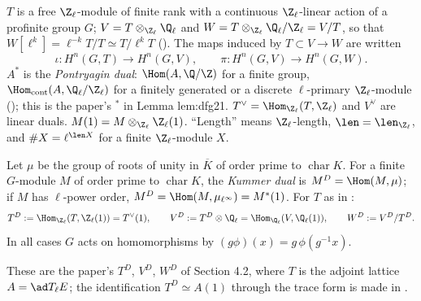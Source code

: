 \begin{convention}\label{conv:galcoh:duals}
$T$ is a free $\Z_\ell$-module of finite rank with a continuous $\Z_\ell$-linear action of a profinite group $G$; $V=T\otimes_{\Z_\ell}\Q_\ell$ and
$W=T\otimes_{\Z_\ell}\Q_\ell/\Z_\ell=V/T$, so that $W[\ell^k]=\ell^{-k}T/T\simeq T/\ell^kT$ (). The maps induced by $T\subset V\to W$ are written
\[
\iota\colon H^n(G,T)\to H^n(G,V),\qquad\pi\colon H^n(G,V)\to H^n(G,W).
\]
$A^*$ is the \emph{Pontryagin dual}: $\Hom(A,\Q/\Z)$ for a finite group, $\Hom_{\mathrm{cont}}(A,\Q_\ell/\Z_\ell)$ for a finitely generated or a discrete $\ell$-primary
$\Z_\ell$-module (); this is the paper's ${}^*$ in Lemma lem:dfg21. $T^\vee=\Hom_{\Z_\ell}(T,\Z_\ell)$ and $V^\vee$ are linear duals. $M(1)=M\otimes_{\Z_\ell}\Z_\ell(1)$.
``Length'' means $\Z_\ell$-length, $\len=\len_{\Z_\ell}$, and $\#X=\ell^{\len X}$ for a finite $\Z_\ell$-module $X$.
\end{convention}

\begin{definition}\label{def:galcoh:kummer-duals}
Let $\mu$ be the group of roots of unity in $\overline K$ of order prime to $\operatorname{char}K$. For a finite
$G$-module $M$ of order prime to $\operatorname{char}K$, the \emph{Kummer dual} is $M^D=\Hom(M,\mu)$; if $M$ has $\ell$-power order, $M^D=\Hom(M,\mu_{\ell^\infty})=M^*(1)$. For
$T$ as in :
\[
T^D:=\Hom_{\Z_\ell}(T,\Z_\ell(1))=T^\vee(1),\qquad V^D:=T^D\otimes\Q_\ell=\Hom_{\Q_\ell}(V,\Q_\ell(1)),\qquad W^D:=V^D/T^D .
\]
In all cases $G$ acts on homomorphisms by $(g\phi)(x)=g\,\phi(g^{-1}x)$.
\end{definition}

These are the paper's $T^D$, $V^D$, $W^D$ of Section 4.2, where $T$ is the adjoint lattice $A=\ad T_\ell E$; the identification $T^D\simeq A(1)$ through the trace form
is made in .

